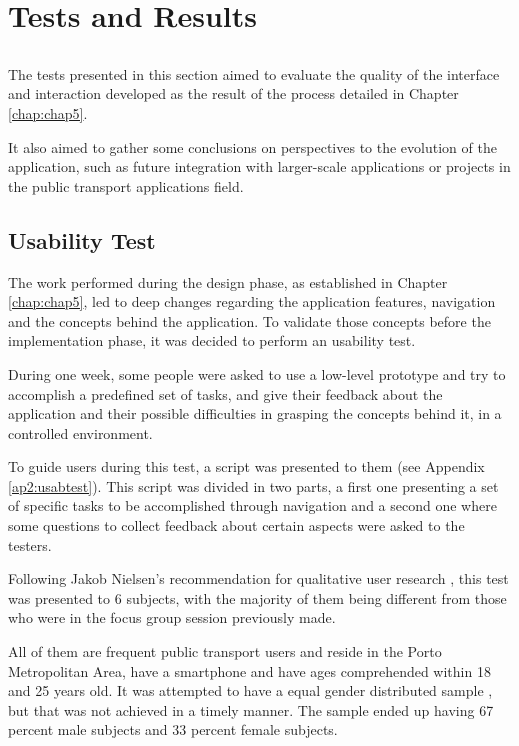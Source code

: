 \chapter{Tests and Results} \label{chap:chap6}

\section*{}

The tests presented in this section aimed to evaluate the quality of the interface and interaction developed as the result of the process detailed in Chapter \ref{chap:chap5}. 

It also aimed to gather some conclusions on perspectives to the evolution of the application, such as future integration with larger-scale applications or projects in the public transport applications field.

\section{Usability Test}

The work performed during the design phase, as established in Chapter \ref{chap:chap5}, led to deep changes regarding the application features, navigation and the concepts behind the application. To validate those concepts before the implementation phase, it was decided to perform an usability test.


During one week, some people were asked to use a low-level prototype and try to accomplish a predefined set of tasks, and give their feedback about the application and their possible difficulties in grasping the concepts behind it, in a controlled environment.

To guide users during this test, a script was presented to them (see Appendix \ref{ap2:usabtest}). This script was divided in two parts, a first one presenting a set of specific tasks to be accomplished through navigation and a second one where some questions to collect feedback about certain aspects were asked to the testers.

Following Jakob Nielsen's recommendation for qualitative user research \cite{kn:NB12}, this test was presented to 6 subjects, with the majority of them being different from those who were in the focus group session previously made.

All of them are frequent public transport users and reside in the Porto Metropolitan Area, have a smartphone and have ages comprehended within 18 and 25 years old. It was attempted to have a equal gender distributed sample , but that was not achieved in a timely manner. The sample ended up having 67 percent male subjects and 33 percent female subjects.

